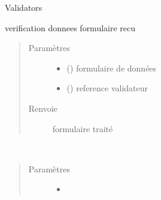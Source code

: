 \documentclass[letterpaper,10pt,french]{sphinxmanual}
\begin{document}
\begin{fulllineitems}
\label{\detokenize{classes/cfgloader:toolbox.validata.Validata}}
Validators

\begin{fulllineitems}
\label{\detokenize{classes/cfgloader:toolbox.validata.Validata.check_post_data}}
verification donnees formulaire recu
\begin{quote}\begin{description}
\item[{Paramètres}] \leavevmode\begin{itemize}
\item {} 
 () \textendash{} formulaire de données

\item {} 
 () \textendash{} reference validateur

\end{itemize}

\item[{Renvoie}] \leavevmode
formulaire traité

\end{description}\end{quote}

\end{fulllineitems}


\begin{fulllineitems}
\label{\detokenize{classes/cfgloader:toolbox.validata.Validata.normalisation}}~\begin{quote}\begin{description}
\item[{Paramètres}] \leavevmode\begin{itemize}
\item {} 
 \textendash{} 


\end{itemize}
\end{description}
\end{quote}
\end{fulllineitems}
\end{fulllineitems}
\end{document}

